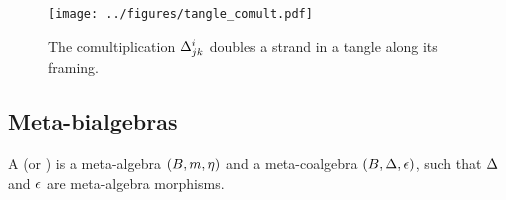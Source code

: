 \documentclass{beamer}
\theoremstyle{theorem}
\begin{document}
\begin{frame}
        \begin{figure}
                \centering
                \texttt{[image: ../figures/tangle\_comult.pdf]}
                \caption{%
                        The comultiplication $\Delta^{i}_{jk}$ doubles a
                        strand in a tangle along its framing.%
                }
                \label{fig:tangle_comult}
        \end{figure}
\end{frame}

\subsection{Meta-bialgebras}

\begin{frame}
        \begin{definition}
                A  (or ) is a
                meta-algebra $(B,m,\eta)$ and a meta-coalgebra
                $(B,\Delta,\epsilon)$, such that $\Delta$ and $\epsilon$ are
                meta-algebra morphisms.
        \end{definition}
\end{frame}
\end{document}
